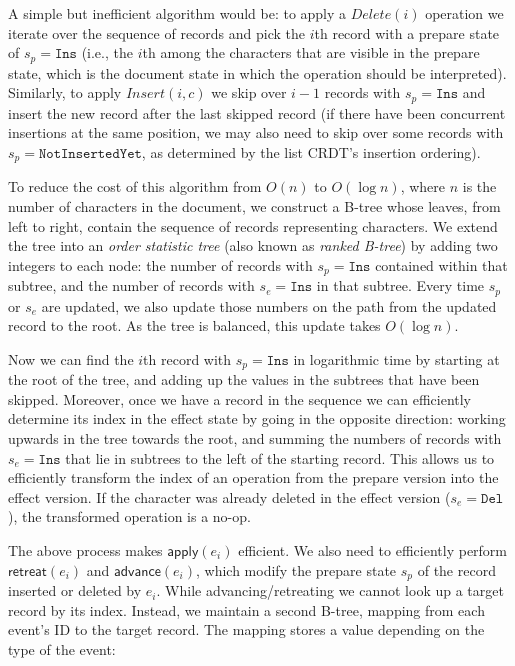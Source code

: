 \documentclass[sigplan,10pt]{acmart}
\begin{document}
A simple but inefficient algorithm would be: to apply a $\mathit{Delete}(i)$ operation we iterate over the sequence of records and pick the $i$th record with a prepare state of $s_p = \texttt{Ins}$ (i.e., the $i$th among the characters that are visible in the prepare state, which is the document state in which the operation should be interpreted).
Similarly, to apply $\mathit{Insert}(i, c)$ we skip over $i - 1$ records with $s_p = \texttt{Ins}$ and insert the new record after the last skipped record (if there have been concurrent insertions at the same position, we may also need to skip over some records with $s_p = \texttt{NotInsertedYet}$, as determined by the list CRDT's insertion ordering).

To reduce the cost of this algorithm from $O(n)$ to $O(\log n)$, where $n$ is the number of characters in the document, we construct a B-tree whose leaves, from left to right, contain the sequence of records representing characters.
We extend the tree into an \emph{order statistic tree} \cite{CLRS2009} (also known as \emph{ranked B-tree}) by adding two integers to each node: the number of records with $s_p = \texttt{Ins}$ contained within that subtree, and the number of records with $s_e = \texttt{Ins}$ in that subtree.
Every time $s_p$ or $s_e$ are updated, we also update those numbers on the path from the updated record to the root.
As the tree is balanced, this update takes $O(\log n)$.

Now we can find the $i$th record with $s_p = \texttt{Ins}$ in logarithmic time by starting at the root of the tree, and adding up the values in the subtrees that have been skipped.
Moreover, once we have a record in the sequence we can efficiently determine its index in the effect state by going in the opposite direction: working upwards in the tree towards the root, and summing the numbers of records with $s_e = \texttt{Ins}$ that lie in subtrees to the left of the starting record.
This allows us to efficiently transform the index of an operation from the prepare version into the effect version.
If the character was already deleted in the effect version ($s_e = \texttt{Del}$), the transformed operation is a no-op.

The above process makes $\mathsf{apply}(e_i)$ efficient.
We also need to efficiently perform $\mathsf{retreat}(e_i)$ and $\mathsf{advance}(e_i)$, which modify the prepare state $s_p$ of the record inserted or deleted by $e_i$.
While advancing/retreating we cannot look up a target record by its index. Instead, we maintain a second B-tree, mapping from each event's ID to the target record. The mapping stores a value depending on the type of the event:
\end{document}
